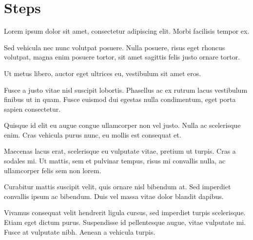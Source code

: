 \documentclass{recipe}
\begin{document}
\section{Steps}
\begin{steps}
\item Lorem ipsum dolor sit amet, consectetur adipiscing elit. Morbi facilisis tempor ex.
\item Sed vehicula nec nunc volutpat posuere. Nulla posuere, risus eget rhoncus volutpat, magna enim posuere tortor, sit amet sagittis felis justo ornare tortor.
\item Ut metus libero, auctor eget ultrices eu, vestibulum sit amet eros. \item Fusce a justo vitae nisl suscipit lobortis. Phasellus ac ex rutrum lacus vestibulum finibus ut in quam. Fusce euismod dui egestas nulla condimentum, eget porta sapien consectetur.
\item Quisque id elit eu augue congue ullamcorper non vel justo. Nulla ac scelerisque enim. Cras vehicula purus nunc, eu mollis est consequat et.
\item Maecenas lacus erat, scelerisque eu vulputate vitae, pretium ut turpis. Cras a sodales mi. Ut mattis, sem et pulvinar tempus, risus mi convallis nulla, ac ullamcorper felis sem non lorem.
\item Curabitur mattis suscipit velit, quis ornare nisl bibendum at. Sed imperdiet convallis ipsum ac bibendum. Duis vel massa vitae dolor blandit dapibus. 
\item Vivamus consequat velit hendrerit ligula cursus, sed imperdiet turpis scelerisque. Etiam eget dictum purus. Suspendisse id pellentesque augue, vitae vulputate mi. Fusce at vulputate nibh. Aenean a vehicula turpis.
\end{steps}
\end{document}
